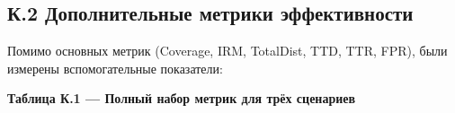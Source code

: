 \documentclass[14pt,a4paper]{extarticle}
\begin{document}
\hypertarget{ux43a.2-ux434ux43eux43fux43eux43bux43dux438ux442ux435ux43bux44cux43dux44bux435-ux43cux435ux442ux440ux438ux43aux438-ux44dux444ux444ux435ux43aux442ux438ux432ux43dux43eux441ux442ux438}{%
\subsection{К.2 Дополнительные метрики эффективности}\label{ux43a.2-ux434ux43eux43fux43eux43bux43dux438ux442ux435ux43bux44cux43dux44bux435-ux43cux435ux442ux440ux438ux43aux438-ux44dux444ux444ux435ux43aux442ux438ux432ux43dux43eux441ux442ux438}}

Помимо основных метрик (Coverage, IRM, TotalDist, TTD, TTR, FPR), были измерены вспомогательные показатели:

\textbf{Таблица К.1 --- Полный набор метрик для трёх сценариев}
\end{document}
